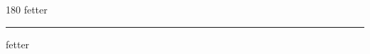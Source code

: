 
\begin{frame}
\begin{center}
\begin{turn}{180}
{\fontsize{2.5cm}{1em}\selectfont fetter}
\end{turn}
\vspace{1em}\par  
\hrule
\vspace{1em}\par  
{\fontsize{2.5cm}{1em}\selectfont fetter}
\end{center}
\end{frame}
